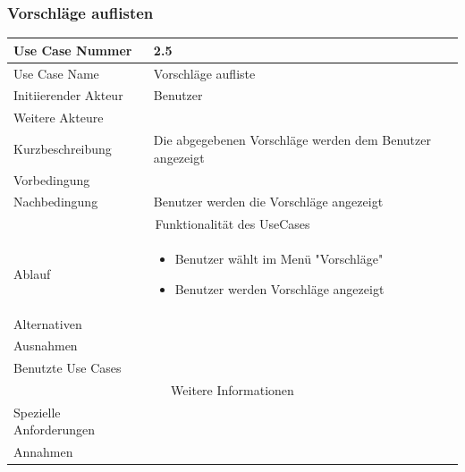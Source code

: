 \documentclass[10pt,a4paper]{article}
\begin{document}
\subsubsection{Vorschl\"age auflisten}
		\begin{tabular}{|l|p{.5\linewidth}|}
		\hline Use Case Nummer & 2.5 \\ 
		\hline Use Case Name & Vorschl\"age aufliste \\ 
		\hline Initiierender Akteur & Benutzer \\
		\hline Weitere Akteure &  \\
		\hline Kurzbeschreibung & Die abgegebenen Vorschl\"age werden dem Benutzer angezeigt \\
		\hline Vorbedingung &  \\
		\hline Nachbedingung & Benutzer werden die Vorschl\"age angezeigt \\
		\hline \multicolumn{2}{|c|}{Funktionalität des UseCases}\\
		\hline Ablauf & \begin{itemize}
			\item Benutzer w\"ahlt im Men\"u "Vorschl\"age"
			\item Benutzer werden Vorschl\"age angezeigt
		\end{itemize} \\
		\hline Alternativen &  \\
		\hline Ausnahmen &  \\
		\hline Benutzte Use Cases &  \\
		\hline \multicolumn{2}{|c|}{Weitere Informationen} \\
		\hline Spezielle Anforderungen &  \\
		\hline Annahmen &  \\
		\hline
		\end{tabular}
\end{document}
